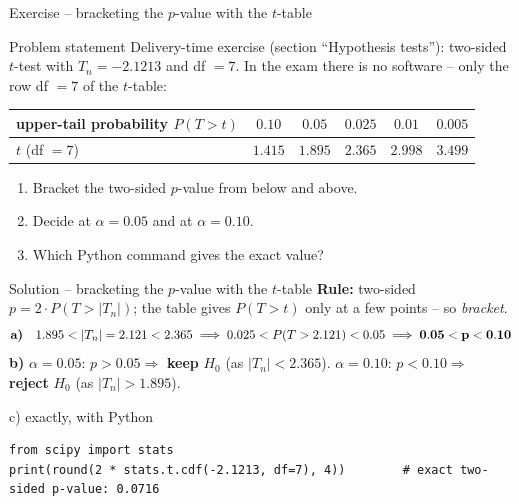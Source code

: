 \documentclass[aspectratio=169,11pt]{beamer}
\begin{document}
\begin{frame}{Exercise -- bracketing the $p$-value with the $t$-table}
  \begin{block}{Problem statement}
    Delivery-time exercise (section ``Hypothesis tests''): two-sided $t$-test
    with $T_n=-2.1213$ and df $=7$. In the exam there is no software -- only
    the row df $=7$ of the $t$-table:
    \begin{center}
      \renewcommand{\arraystretch}{1.2}
      \begin{tabular}{l|ccccc}
        \toprule
        upper-tail probability $P(T>t)$ & $0.10$ & $0.05$ & $0.025$ & $0.01$ & $0.005$\\
        \midrule
        $t$ (df $=7$) & $1.415$ & $1.895$ & $2.365$ & $2.998$ & $3.499$\\
        \bottomrule
      \end{tabular}
    \end{center}
  \end{block}
  \begin{enumerate}\setlength{\itemsep}{1pt}
    \item[a)] Bracket the two-sided $p$-value from below and above.
    \item[b)] Decide at $\alpha=0.05$ and at $\alpha=0.10$.
    \item[c)] Which Python command gives the exact value?
  \end{enumerate}
\end{frame}

\begin{frame}[fragile]{Solution -- bracketing the $p$-value with the $t$-table}
  \small
  \textbf{Rule:} two-sided $p=2\cdot P(T>|T_n|)$; the table gives $P(T>t)$
  only at a few points -- so \emph{bracket}.
  \[
    \text{\textbf{a)}}\quad 1.895<|T_n|=2.121<2.365
      \;\Longrightarrow\; 0.025<P(T>2.121)<0.05
      \;\Longrightarrow\; \mathbf{0.05<p<0.10}
  \]
  \textbf{b)} $\alpha=0.05$: $p>0.05\Rightarrow$ \textbf{keep} $H_0$ (as
  $|T_n|<2.365$). \quad $\alpha=0.10$: $p<0.10\Rightarrow$ \textbf{reject}
  $H_0$ (as $|T_n|>1.895$).
  \begin{block}{c) exactly, with Python}
\begin{lstlisting}
from scipy import stats
print(round(2 * stats.t.cdf(-2.1213, df=7), 4))        # exact two-sided p-value: 0.0716
\end{lstlisting}
  \end{block}
\end{frame}
\end{document}
